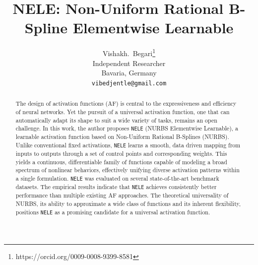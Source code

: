 \documentclass{article}
\title{NELE: Non-Uniform Rational B-Spline Elementwise Learnable}
\author{%
  Vishakh.~Begari\thanks{https://orcid.org/0009-0008-9399-8581} \\
  Independent Researcher\\
  Bavaria, Germany \\
  \texttt{vibedjentle@gmail.com} \\
}
\begin{document}
\maketitle


\begin{abstract}
  The design of activation functions (AF) 
    is central to the expressiveness and efficiency of neural networks. 
    Yet the pursuit of a universal activation function, one that can 
    automatically adapt its shape to suit a wide variety of tasks, remains 
    an open challenge. In this work, the author proposes \texttt{NELE} (NURBS Elementwise Learnable), 
    a learnable activation function based on Non-Uniform Rational B-Splines (NURBS).
    Unlike conventional fixed activations, \texttt{NELE} 
    learns a smooth, data driven mapping from inputs to outputs 
    through a set of control points and corresponding weights.
    This yields a continuous, differentiable family of functions capable 
    of modeling a broad spectrum of nonlinear behaviors, effectively 
    unifying diverse activation patterns within a single formulation.
    \texttt{NELE} was evaluated on several state-of-the-art benchmark datasets.
    The empirical results indicate that \texttt{NELE} achieves consistently better performance 
    than multiple existing AF approaches. The theoretical universality of NURBS, its ability to approximate a wide class 
    of functions and its inherent flexibility, positions \texttt{NELE} as a promising candidate 
    for a universal activation function.

\end{abstract}
\end{document}
